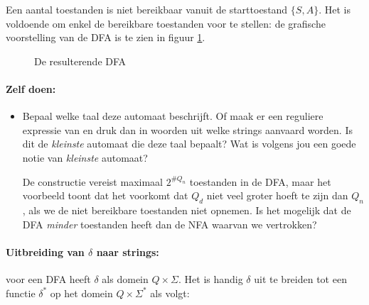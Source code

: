 Een aantal toestanden is niet bereikbaar vanuit de starttoestand
$\{S,A\}$. Het is voldoende om enkel de bereikbare toestanden voor te
stellen: de grafische voorstelling van de DFA is te zien in figuur
\ref{fsa3}.

\clearpage
\begin{figure}[h]
\caption{De resulterende DFA \label{fsa3}}
\end{figure}

\paragraph{Zelf doen:}
\begin{itemize}
\item[]
Bepaal welke taal deze automaat beschrijft. Of maak er een reguliere
expressie van en druk dan in woorden uit welke strings aanvaard
worden. Is dit de {\em kleinste} automaat die deze taal bepaalt? Wat
is volgens jou een goede notie van {\em kleinste} automaat?


De constructie vereist maximaal $2^{\#Q_n}$ toestanden in de DFA, maar
het voorbeeld toont dat het voorkomt dat $Q_d$ niet veel groter hoeft
te zijn dan $Q_n$, als we de niet bereikbare toestanden niet opnemen.
Is het mogelijk dat de DFA {\em minder} toestanden heeft dan de NFA
waarvan we vertrokken?

\end{itemize}



\paragraph{Uitbreiding van $\delta$ naar strings:} voor een DFA heeft
$\delta$ als domein $Q \times \Sigma$. Het is handig $\delta$ uit te
breiden tot een functie $\delta^*$ op het domein $Q \times \Sigma^*$
als volgt:

